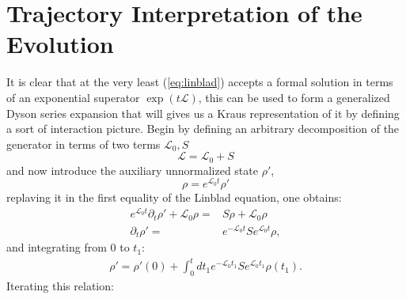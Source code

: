\section{Trajectory Interpretation of the Evolution}
It is clear that at the very least (\ref{eq:linblad}) accepts a formal solution in terms of an exponential superator $\exp(t\mathcal{L})$,
this can be used to form a generalized Dyson series expansion that will gives us a Kraus representation of it by defining a sort
of interaction picture. Begin by defining an
arbitrary decomposition of the generator in terms of two terms $\mathcal{L}_{0}, S$
\begin{equation}
  \mathcal{L} = \mathcal{L}_{0} + S
\end{equation}
and now introduce the auxiliary unnormalized state $\rho'$,
\begin{equation}
\rho = e^{\mathcal{L}_{0}t}\rho'
\end{equation}
replaving it in the first equality of the Linblad equation, one obtains:
\begin{align}
  e^{\mathcal{L}_{0}t}\partial_{t}\rho' + \mathcal{L}_{0}\rho =& S\rho + \mathcal{L}_{0}\rho \\
\partial_{t}\rho' =& e^{-\mathcal{L}_{0}t}Se^{\mathcal{L}_{0}t}\rho,
\end{align}
and integrating from 0 to $t_{1}$:
\begin{align}
\rho' = \rho'(0) + \int_{0}^{t}dt_{1} e^{-\mathcal{L}_{0}t_{1}}Se^{\mathcal{L}_{0}t_{1}}\rho(t_{1}).
\end{align}
Iterating this relation:

